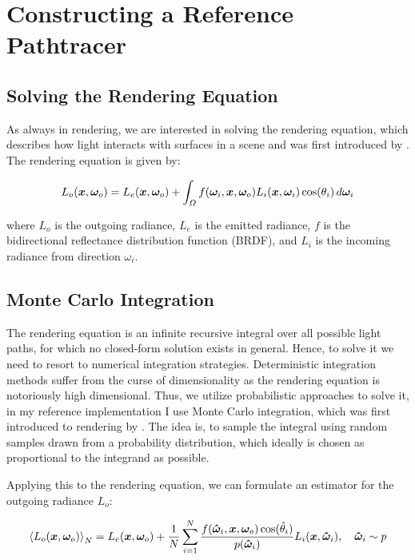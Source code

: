 
\chapter{Constructing a Reference Pathtracer}
\label{chap:pathtracing}

\section{Solving the Rendering Equation}

As always in rendering, we are interested in solving the rendering equation, which describes how light interacts with surfaces in a scene and was first introduced by \textcite{kajiya1986}.
The rendering equation is given by:

\begin{equation}
    L_o(\bm{x}, \bm{\omega}_o) = L_e(\bm{x}, \bm{\omega}_o) + \int_{\Omega} f(\bm{\omega}_i, \bm{x}, \bm{\omega}_o) L_i(\bm{x}, \bm{\omega}_i) \cos(\theta_i) \mathop{}\!d\bm{\omega}_i
\end{equation}

where $L_o$ is the outgoing radiance, $L_e$ is the emitted radiance, $f$ is the bidirectional reflectance distribution function (BRDF), and $L_i$ is the incoming radiance from direction $\omega_i$.

\section{Monte Carlo Integration}

The rendering equation is an infinite recursive integral over all possible light paths, for which no closed-form solution exists in general.
Hence, to solve it we need to resort to numerical integration strategies.
Deterministic integration methods suffer from the curse of dimensionality as the rendering equation is notoriously high dimensional.
Thus, we utilize probabilistic approaches to solve it, in my reference implementation I use Monte Carlo integration, which was first introduced to rendering by \textcite{kajiya1986}.
The idea is, to sample the integral using random samples drawn from a probability distribution, which ideally is chosen as proportional to the integrand as possible.

Applying this to the rendering equation, we can formulate an estimator for the outgoing radiance $L_o$:

\begin{equation}
    \estimator{L_o(\vec{x}, \vec{\omega}_o)} = L_e(\vec{x}, \vec{\omega}_o) + \frac{1}{N} \sum_{i=1}^{N} \frac{f(\vec{\hat{\omega}}_i, \vec{x}, \vec{\omega}_o) \cos(\hat{\theta}_i)}{p(\vec{\hat{\omega}}_i)} L_i(\vec{x}, \vec{\hat{\omega}}_i), \quad \vec{\hat{\omega}}_i \sim p
\end{equation}

